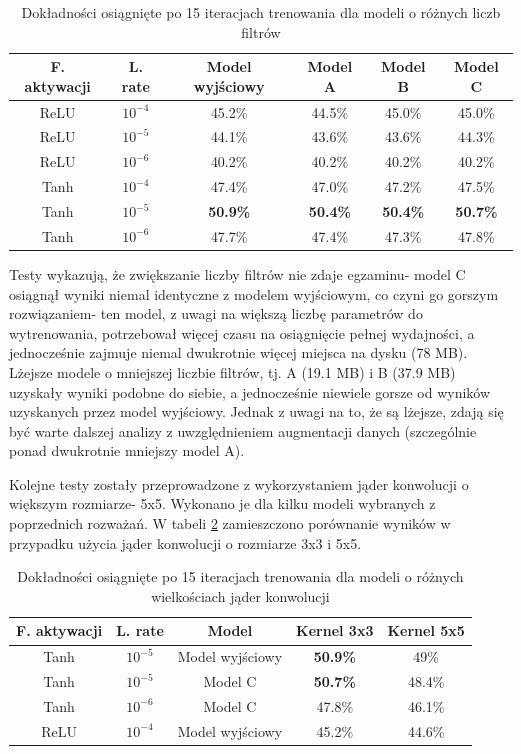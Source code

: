 \begin{table}[H]
  \centering
  \caption{Dokładności osiągnięte po 15 iteracjach trenowania dla modeli o różnych liczb filtrów}
    \begin{tabular}{ |c|c|c|c|c|c| }
    \hline
    F. aktywacji & L. rate & Model wyjściowy & Model A & Model B & Model C \\
    \hline
    ReLU & $10^{-4}$ & 45.2\% & 44.5\% & 45.0\% & 45.0\% \\
    ReLU & $10^{-5}$ & 44.1\% & 43.6\% & 43.6\% & 44.3\% \\
    ReLU & $10^{-6}$ & 40.2\% & 40.2\% & 40.2\% & 40.2\% \\
    Tanh & $10^{-4}$ & 47.4\% & 47.0\% & 47.2\% & 47.5\% \\
    Tanh & $10^{-5}$ & \textbf{50.9\%} & \textbf{50.4\%} & \textbf{50.4\%} & \textbf{50.7\%} \\
    Tanh & $10^{-6}$ & 47.7\% & 47.4\% & 47.3\% & 47.8\% \\
    \hline
    \end{tabular}
  \label{tab:5.3}
\end{table}

Testy wykazują, że zwiększanie liczby filtrów nie zdaje egzaminu- model C osiągnął wyniki niemal identyczne z modelem wyjściowym, co czyni go gorszym rozwiązaniem- ten model, z uwagi na większą liczbę parametrów do wytrenowania, potrzebował więcej czasu na osiągnięcie pełnej wydajności, a jednocześnie zajmuje niemal dwukrotnie więcej miejsca na dysku (78 MB). Lżejsze modele o mniejszej liczbie filtrów, tj. A (19.1 MB) i B (37.9 MB) uzyskały wyniki podobne do siebie, a jednocześnie niewiele gorsze od wyników uzyskanych przez model wyjściowy. Jednak z uwagi na to, że są lżejsze, zdają się być warte dalszej analizy z uwzględnieniem augmentacji danych (szczególnie ponad dwukrotnie mniejszy model A).

Kolejne testy zostały przeprowadzone z wykorzystaniem jąder konwolucji o większym rozmiarze- 5x5. Wykonano je dla kilku modeli wybranych z poprzednich rozważań. W tabeli \ref{tab:5.4} zamieszczono porównanie wyników w przypadku użycia jąder konwolucji o rozmiarze 3x3 i 5x5.

\begin{table}[H]
  \centering
  \caption{Dokładności osiągnięte po 15 iteracjach trenowania dla modeli o różnych wielkościach jąder konwolucji}
    \begin{tabular}{ |c|c|c|c|c| }
    \hline
    F. aktywacji & L. rate & Model & Kernel 3x3 & Kernel 5x5 \\
    \hline
    Tanh & $10^{-5}$ & Model wyjściowy & \textbf{50.9\%} & 49\% \\
    Tanh & $10^{-5}$ & Model C & \textbf{50.7\%} & 48.4\% \\
    Tanh & $10^{-6}$ & Model C & 47.8\% & 46.1\% \\
    ReLU & $10^{-4}$ & Model wyjściowy & 45.2\% & 44.6\% \\
    \hline
    \end{tabular}
  \label{tab:5.4}
\end{table}

